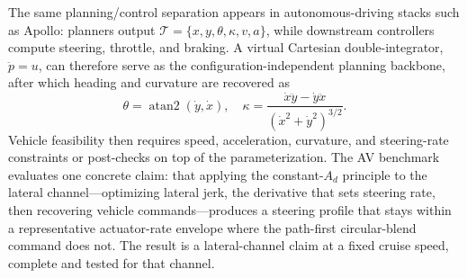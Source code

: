 The same planning/control separation appears in autonomous-driving
stacks such as Apollo: planners output
\(\mathcal T=\{x,y,\theta,\kappa,v,a\}\), while downstream controllers
compute steering, throttle, and braking. A virtual Cartesian
double-integrator, \(\ddot p=u\), can therefore serve as the
configuration-independent planning backbone, after which heading and
curvature are recovered as
\begin{equation}
\label{eq:vehicle-recovery}
\theta=\operatorname{atan2}(\dot y,\dot x),\quad
\kappa=\frac{\dot x\ddot y-\dot y\ddot x}{(\dot x^2+\dot y^2)^{3/2}} .
\end{equation}
Vehicle feasibility then requires speed, acceleration, curvature, and
steering-rate constraints or post-checks on top of the parameterization.
The AV benchmark evaluates one concrete
claim: that applying the constant-\(A_d\) principle to the lateral
channel---optimizing lateral jerk, the derivative that sets steering rate,
then recovering vehicle commands---produces a steering profile that stays
within a representative actuator-rate envelope where the path-first
circular-blend command does not. The result is a lateral-channel claim at
a fixed cruise speed, complete and tested for that channel.

